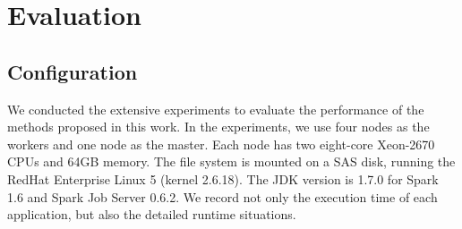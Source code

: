 \section{Evaluation}

\subsection{Configuration}

We conducted the extensive experiments to evaluate the performance of the methods proposed in this work. In the experiments, we use four nodes as the workers and one node as the master. Each node has two eight-core Xeon-2670 CPUs and 64GB memory. The file system is mounted on a SAS disk, running the RedHat Enterprise Linux 5 (kernel 2.6.18). The JDK version is 1.7.0 for Spark 1.6 and Spark Job Server 0.6.2. We record not only the execution time of each application, but also the detailed runtime situations.

\begin{comment}
\begin{table}[!t]
\small
\centering
\caption{Function APIs in each Application}
\begin{tabular}{ c | c | c | c }

\hline
\textbf{App} & \textbf{Stages} & \textbf{Function API(s)} & \textbf{Cache} \\
\hline
SQ & 1 & \textit{filter} & No \\
\hline
AQ & 2 & \textit{flatMap} \& \textit{reduceByKey} & No \\
\hline
Sort & 3 & \textit{distinct} \& \textit{sortByKey} & No \\
\hline
PR & N & \textit{groupByKey} \& \textit{map} \& \textit{reduceByKey} & Yes \\
\hline

\hline
\end{tabular}
\vspace{-4mm}
\label{table:app}
\end{table} 
\end{comment}

